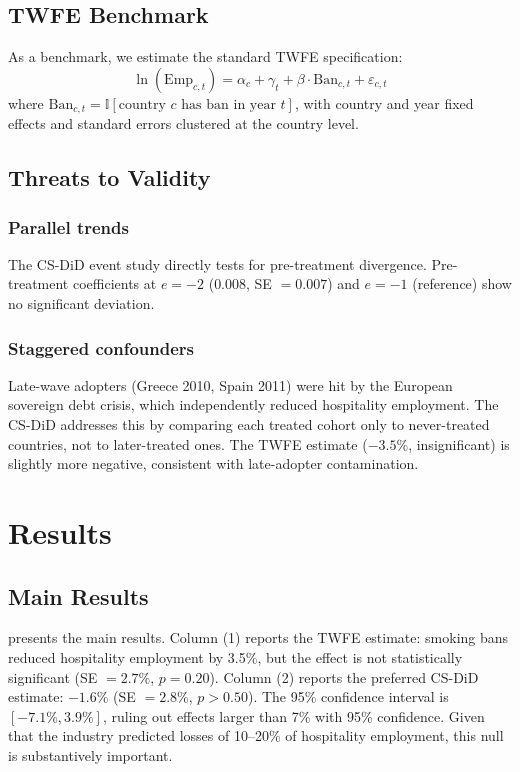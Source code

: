 \documentclass[12pt]{article}
\newcommand{\ind}{\mathbb{I}}
\begin{document}
\subsection{TWFE Benchmark}

As a benchmark, we estimate the standard TWFE specification:
\begin{equation}
\ln(\text{Emp}_{c,t}) = \alpha_c + \gamma_t + \beta \cdot \text{Ban}_{c,t} + \varepsilon_{c,t}
\end{equation}
where $\text{Ban}_{c,t} = \ind[\text{country } c \text{ has ban in year } t]$, with country and year fixed effects and standard errors clustered at the country level.

\subsection{Threats to Validity}

\subsubsection*{Parallel trends} The CS-DiD event study directly tests for pre-treatment divergence. Pre-treatment coefficients at $e = -2$ ($0.008$, SE $= 0.007$) and $e = -1$ (reference) show no significant deviation.

\subsubsection*{Staggered confounders} Late-wave adopters (Greece 2010, Spain 2011) were hit by the European sovereign debt crisis, which independently reduced hospitality employment. The CS-DiD addresses this by comparing each treated cohort only to never-treated countries, not to later-treated ones. The TWFE estimate ($-3.5\%$, insignificant) is slightly more negative, consistent with late-adopter contamination.


\section{Results}

\subsection{Main Results}



 presents the main results. Column (1) reports the TWFE estimate: smoking bans reduced hospitality employment by 3.5\%, but the effect is not statistically significant (SE $= 2.7\%$, $p = 0.20$). Column (2) reports the preferred CS-DiD estimate: $-1.6\%$ (SE $= 2.8\%$, $p > 0.50$). The 95\% confidence interval is $[-7.1\%, 3.9\%]$, ruling out effects larger than 7\% with 95\% confidence. Given that the industry predicted losses of 10--20\% of hospitality employment, this null is substantively important.
\end{document}

